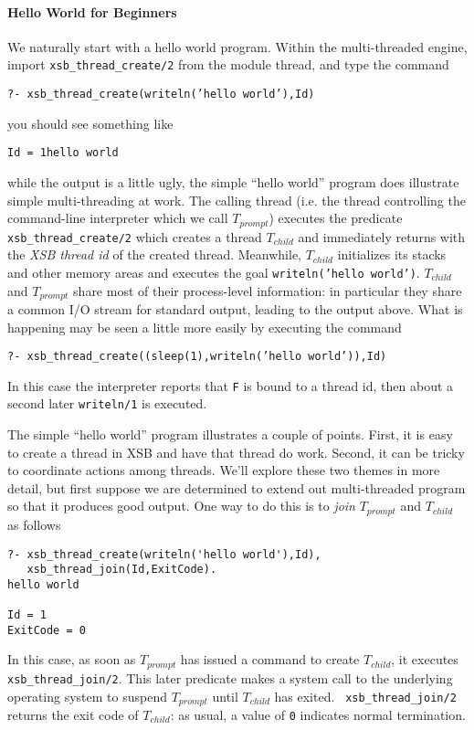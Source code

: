 {\paragraph{Hello World for Beginners}
%
We naturally start with a hello world program.  Within the
multi-threaded engine, import {\tt xsb\_thread\_create/2} from the
module thread, and type the command 
\begin{center} 
{\tt ?- xsb\_thread\_create(writeln('hello world'),Id)} 
\end{center} 
you should see something like 
\begin{center} 
{\tt Id = 1hello world} 
\end{center} 
%
while the output is a little ugly, the simple ``hello world'' program
does illustrate simple multi-threading at work.  The calling thread
(i.e. the thread controlling the command-line interpreter which we
call $T_{prompt}$) executes the predicate {\tt xsb\_thread\_create/2}
which creates a thread $T_{child}$ and immediately returns with the
{\em XSB thread id} of the created thread.  Meanwhile, $T_{child}$
initializes its stacks and other memory areas and executes the goal
{\tt writeln('hello world')}.  $T_{child}$ and $T_{prompt}$ share most
of their process-level information: in particular they share a common
I/O stream for standard output, leading to the output above.  What is
happening may be seen a little more easily by executing the command
%
\begin{center} 
{\tt ?- xsb\_thread\_create((sleep(1),writeln('hello world')),Id)} 
\end{center} 
%
In this case the interpreter reports that {\tt F} is bound to a thread
id, then about a second later {\tt writeln/1} is executed.  

The simple ``hello world'' program illustrates a couple of points.
First, it is easy to create a thread in XSB and have that thread do
work.  Second, it can be tricky to coordinate actions among threads.
We'll explore these two themes in more detail, but first suppose we
are determined to extend out multi-threaded program so that it
produces good output.  One way to do this is to {\em join}
$T_{prompt}$ and $T_{child}$ as follows 
%
\begin{verbatim}
?- xsb_thread_create(writeln('hello world'),Id),
   xsb_thread_join(Id,ExitCode).
hello world

Id = 1
ExitCode = 0
\end{verbatim}
%
In this case, as soon as $T_{prompt}$ has issued a command to create
$T_{child}$, it executes {\tt xsb\_thread\_join/2}.  This later
predicate makes a system call to the underlying operating system to
suspend $T_{prompt}$ until $T_{child}$ has exited.  {\tt
  xsb\_thread\_join/2} returns the exit code of $T_{child}$: as usual,
a value of {\tt 0} indicates normal termination.  

}
